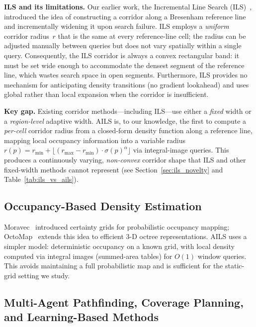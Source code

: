 \documentclass[journal]{IEEEtran}
\begin{document}
\textbf{ILS and its limitations.}
Our earlier work, the Incremental Line Search (ILS)~\cite{elshahed2025ils}, introduced the idea of constructing a corridor along a Bresenham reference line and incrementally widening it upon search failure.
ILS employs a \emph{uniform} corridor radius~$r$ that is the same at every reference-line cell; the radius can be adjusted manually between queries but does not vary spatially within a single query.
Consequently, the ILS corridor is always a convex rectangular band: it must be set wide enough to accommodate the densest segment of the reference line, which wastes search space in open segments.
Furthermore, ILS provides no mechanism for anticipating density transitions (no gradient lookahead) and uses global rather than local expansion when the corridor is insufficient.

\textbf{Key gap.}
Existing corridor methods---including ILS---use either a \emph{fixed} width or a \emph{region-level} adaptive width.
AILS is, to our knowledge, the first to compute a \emph{per-cell} corridor radius from a closed-form density function along a reference line, mapping local occupancy information into a variable radius $r(p) = r_{\min} + \lfloor (r_{\max} - r_{\min}) \cdot \sigma(p)^{\alpha} \rfloor$ via integral-image queries.
This produces a continuously varying, \emph{non-convex} corridor shape that ILS and other fixed-width methods cannot represent (see Section~\ref{sec:ils_novelty} and Table~\ref{tab:ils_vs_ails}).

\subsection{Occupancy-Based Density Estimation}

Moravec~\cite{moravec1988sensor} introduced certainty grids for probabilistic occupancy mapping; OctoMap~\cite{hornung2013octomap} extends this idea to efficient 3-D octree representations.
AILS uses a simpler model: deterministic occupancy on a known grid, with local density computed via integral images (summed-area tables) for $O(1)$ window queries.
This avoids maintaining a full probabilistic map and is sufficient for the static-grid setting we study.

\subsection{Multi-Agent Pathfinding, Coverage Planning, and Learning-Based Methods}
\end{document}
